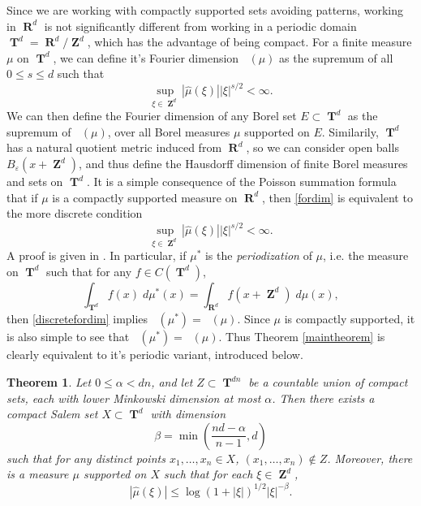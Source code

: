 \documentclass[12pt,reqno]{article}
\DeclareMathOperator{\hausdim}{\dim_{\mathbf{H}}}
\DeclareMathOperator{\fordim}{\dim_{\mathbf{F}}}
\DeclareMathOperator{\RR}{\mathbf{R}}
\DeclareMathOperator{\ZZ}{\mathbf{Z}}
\DeclareMathOperator{\TT}{\mathbf{T}}
\newtheorem{theorem}{Theorem}
\begin{document}
Since we are working with compactly supported sets avoiding patterns, working in $\RR^d$ is not significantly different from working in a periodic domain $\TT^d = \RR^d / \ZZ^d$, which has the advantage of being compact. For a finite measure $\mu$ on $\TT^d$, we can define it's Fourier dimension $\fordim(\mu)$ as the supremum of all $0 \leq s \leq d$ such that
%
\begin{equation} \label{fordimtorus}
    \sup_{\xi \in \ZZ^d} |\widehat{\mu}(\xi)| |\xi|^{s/2} < \infty.
\end{equation}
%
We can then define the Fourier dimension of any Borel set $E \subset \TT^d$ as the supremum of $\fordim(\mu)$, over all Borel measures $\mu$ supported on $E$. Similarily, $\TT^d$ has a natural quotient metric induced from $\RR^d$, so we can consider open balls $B_\varepsilon(x + \ZZ^d)$, and thus define the Hausdorff dimension of finite Borel measures and sets on $\TT^d$. It is a simple consequence of the Poisson summation formula that if $\mu$ is a compactly supported measure on $\RR^d$, then \eqref{fordim} is equivalent to the more discrete condition
%
\begin{equation} \label{discretefordim}
    \sup_{\xi \in \ZZ^d} |\widehat{\mu}(\xi)| |\xi|^{s/2} < \infty.
\end{equation}
%
A proof is given in \cite[Lemma 39]{myThesis}. In particular, if $\mu^*$ is the \emph{periodization} of $\mu$, i.e. the measure on $\TT^d$ such that for any $f \in C(\TT^d)$,
%
\[ \int_{\TT^d} f(x)\; d\mu^*(x) = \int_{\RR^d} f(x + \ZZ^d)\; d\mu(x), \]
%
then \eqref{discretefordim} implies $\fordim(\mu^*) = \fordim(\mu)$. Since $\mu$ is compactly supported, it is also simple to see that $\hausdim(\mu^*) = \hausdim(\mu)$. Thus Theorem \ref{maintheorem} is clearly equivalent to it's periodic variant, introduced below.

\begin{theorem} \label{periodictheorem}
    Let $0 \leq \alpha < dn$, and let $Z \subset \TT^{dn}$ be a countable union of compact sets, each with lower Minkowski dimension at most $\alpha$. Then there exists a compact Salem set $X \subset \TT^d$ with dimension
    \[ \beta = \min \left( \frac{nd - \alpha}{n-1}, d \right) \]
    such that for any distinct points $x_1, \dots, x_n \in X$, $(x_1, \dots, x_n) \not \in Z$. Moreover, there is a measure $\mu$ supported on $X$ such that for each $\xi \in \ZZ^d$,
    \[ |\widehat{\mu}(\xi)| \leq \log(1 + |\xi|)^{1/2} |\xi|^{-\beta}. \]
\end{theorem}
\end{document}
